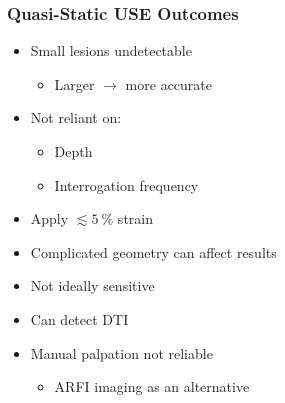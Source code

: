 \documentclass{beamer}
\newcommand{\percent}{\%}
\begin{document}

		\begin{frame}
			\frametitle{Quasi-Static USE Outcomes}
			\begin{itemize}
				\item Small lesions undetectable
				\begin{itemize}
					\item Larger $\rightarrow$ more accurate
				\end{itemize}
				\item Not reliant on:
				\begin{itemize}
					\item Depth
					\item Interrogation frequency
				\end{itemize}
				\item Apply $\lesssim \SI{5}{\percent}$ strain
				\item Complicated geometry can affect results
				\item Not ideally sensitive
				\item \alert{Can detect DTI}
				\item \alert{Manual palpation not reliable}
				\begin{itemize}
					\item ARFI imaging as an alternative
				\end{itemize}
			\end{itemize}
		\end{frame}
\end{document}
